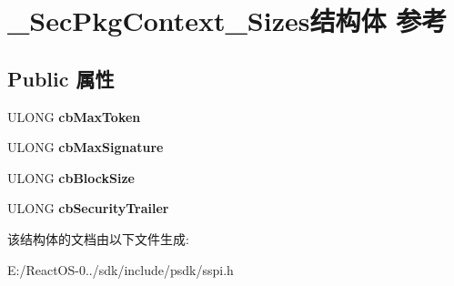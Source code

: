\hypertarget{struct___sec_pkg_context___sizes}{}\section{\+\_\+\+Sec\+Pkg\+Context\+\_\+\+Sizes结构体 参考}
\label{struct___sec_pkg_context___sizes}
\subsection*{Public 属性}
\begin{DoxyCompactItemize}
\item 
\mbox{\label{struct___sec_pkg_context___sizes_ad14d3406b237757f724c763d23572b8c}} 
U\+L\+O\+NG {\bfseries cb\+Max\+Token}
\item 
\mbox{\label{struct___sec_pkg_context___sizes_acb9cea6c0e9f40fb52c102a6fde81856}} 
U\+L\+O\+NG {\bfseries cb\+Max\+Signature}
\item 
\mbox{\label{struct___sec_pkg_context___sizes_a0f6febe5e45ac5c1e136abd98a76ff6e}} 
U\+L\+O\+NG {\bfseries cb\+Block\+Size}
\item 
\mbox{\label{struct___sec_pkg_context___sizes_a58cbac621cdc0adf0ddbc73b556d7eea}} 
U\+L\+O\+NG {\bfseries cb\+Security\+Trailer}
\end{DoxyCompactItemize}


该结构体的文档由以下文件生成\+:\begin{DoxyCompactItemize}
\item 
E\+:/\+React\+O\+S-\/0../sdk/include/psdk/sspi.\+h\end{DoxyCompactItemize}
